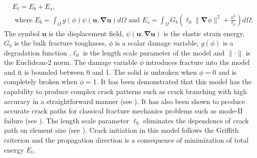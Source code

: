 \documentclass[11pt] {article}
\newcommand{\bs}[1] {\boldsymbol{#1}}
\begin{document}
\begin{align}\label{PFM}
&E_{t} = E_{b} + E_s, \\
&\text{ where } 
E_b = \int_{\Omega}g(\phi) \psi\left(\bs u,\bs \nabla \bs u\right) d\Omega
\text{ and } 
E_s = \int_{\Omega} G_b \left(\ell_0\| \bs \nabla \phi \|^2 +\frac{\phi^2}{\ell_0}\right) d\Omega.
\end{align}
The symbol $\bs{u}$ is the displacement field, $\psi\left(\bs u,\bs \nabla \bs u\right)$ is the elastic strain energy, $G_b$ is the bulk fracture toughness, $\phi$ is a scalar damage variable, $g(\phi)$ is a degradation function ,$\ell_0$ is the length scale parameter of the model and $\|\cdot\|$ is the Euclidean-2 norm. The damage variable $\phi$ introduces fracture into the model and it is bounded between 0 and 1. The solid is unbroken when $\phi = 0$ and is completely broken when $\phi = 1$. It has been demonstrated that this model has the capability to produce complex crack patterns such as crack branching with high accuracy in a straightforward manner (see \cite{borden_2012}). It has also been shown to produce accurate crack paths for classical fracture mechanics problems such as mode-II failure (see \cite{miehe_2010}). The length scale parameter $\ell_0$ eliminates the dependence of crack path on element size (see \cite{miehe_2010,borden_2012}). Crack initiation in this model follows the Griffith criterion and the propagation direction is a consequence of minimization of total energy $E_t$. 


\end{document}
